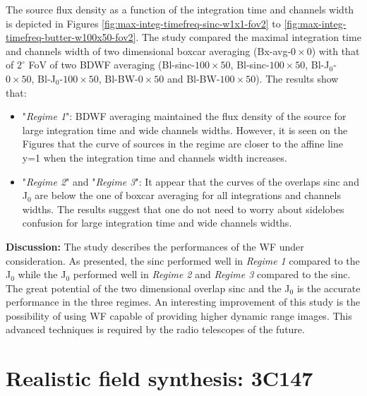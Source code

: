 \documentclass[useAMS,usenatbib]{mn2e}
\begin{document}
The source flux density as a function of the integration time and channels width is depicted in Figures 
\ref{fig:max-integ-timefreq-sinc-w1x1-fov2} to 
 \ref{fig:max-integ-timefreq-butter-w100x50-fov2}. The study compared the maximal integration time and channels width of two dimensional 
boxcar  averaging (Bx-avg-$0\times 0$) 
with that of  $2^{\circ}$ FoV of two BDWF averaging (Bl-sinc-$100\times 50$, Bl-sinc-$100\times 50$, Bl-J$_0$-$0\times 50$, 
Bl-J$_0$-$100\times 50$, Bl-BW-$0\times 50$ and Bl-BW-$100\times 50$). 
The results show that:
\begin{itemize}
 \item "\textit{Regime 1}": BDWF averaging maintained the flux density of the source for large integration time and wide channels widths. 
However, 
it is seen on the Figures that the curve of sources in the regime are closer to the affine line y=1 when the integration time and 
channels width increases.
 \item  "\textit{Regime 2}" and "\textit{Regime 3}":  It appear that the curves of the overlaps sinc and J$_0$ are below the one of boxcar 
averaging for all integrations and channels widths. The 
results suggest that one do not need to worry about sidelobes confusion for large integration time and wide channels widths. 
\end{itemize}

\hspace{-0.64cm}\textbf{Discussion:}
The study describes the performances of the WF under consideration. As presented, the sinc performed well in \textit{Regime 1} compared 
to the J$_0$ while the J$_0$ performed well in \textit{Regime 2} and \textit{Regime 3} compared to the sinc. The great potential  of the 
two dimensional overlap sinc and the J$_0$ is the accurate performance in the three regimes. An interesting improvement of this study is 
the possibility of using WF capable of providing higher dynamic range images. This advanced techniques 
is required by the radio telescopes of the future.
\section{Realistic field synthesis: 3C147}
\end{document}
